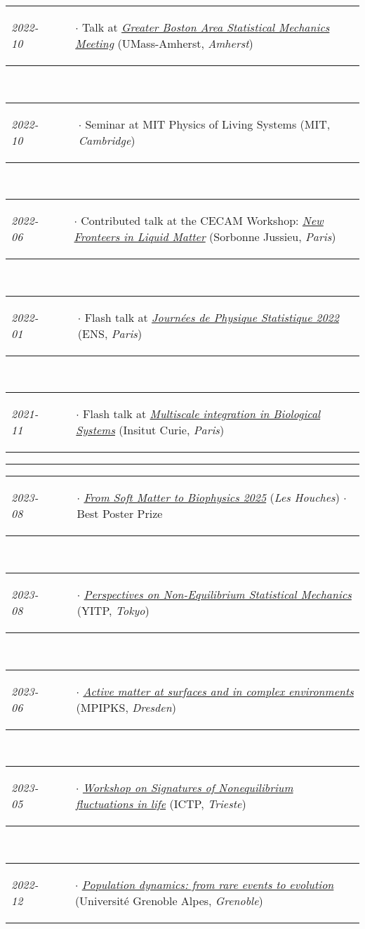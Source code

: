 \documentclass{scrartcl}
\newcommand{\NewItemEntry}[2]{
  \noindent
  \begin{tabular}[r]{p{2.5cm} p{14.0cm}}
    \-\hspace{0.5cm} \small \textit{#1}
    &
    \begin{itemize}
      \vspace{-0.65cm}
      \item[$\cdot$] #2
    \end{itemize}
  \end{tabular}
  \vspace{-0.2cm}
}
\begin{document}
\begin{cv}{}
\NewItemEntry{2022-10}{Talk at \textit{\href{https://sites.google.com/umass.edu/gbasm2022/home}{Greater Boston Area Statistical Mechanics Meeting}} \if{[replacing Prof. Julien Tailleur]}\fi (UMass-Amherst, \textit{Amherst})} \\[\v]
\NewItemEntry{2022-10}{Seminar at MIT Physics of Living Systems (MIT, \textit{Cambridge})}\\[\v]
\NewItemEntry{2022-06}{Contributed talk at the CECAM Workshop: \textit{\href{https://www.cecam.org/workshop-details/1111}{New Fronteers in Liquid Matter}} (Sorbonne Jussieu, \textit{Paris})}\\[\v]
\NewItemEntry{2022-01}{Flash talk at \textit{\href{https://jstat.phys.ens.fr/fr}{Journées de Physique Statistique 2022}} (ENS, \textit{Paris})}\\[\v]
\NewItemEntry{2021-11}{Flash talk at \textit{\href{https://training.institut-curie.org/courses/multiscale-integration-in-biological-systems-3}{Multiscale integration in Biological Systems}} (Insitut Curie, \textit{Paris})}
  
  


\vspace{1em}

\par\noindent\rule{\textwidth}{0.4pt}

\vspace{1.5em}



\noindent{}\vspace{1em}

\NewItemEntry{2023-08}{\textit{\href{https://www.we-heraeus-stiftung.de/veranstaltungen/from-soft-matter-to-biophysics-2025/}{From Soft Matter to Biophysics 2025}} (\textit{Les Houches}) $\cdotp$ \textcolor{carmine}{Best Poster Prize}}\\[\v]
\NewItemEntry{2023-08}{\textit{\href{https://www2.yukawa.kyoto-u.ac.jp/~yitp-ysf2022/index.php}{Perspectives on Non-Equilibrium Statistical Mechanics}} (YITP, \textit{Tokyo})}\\[\v]
\NewItemEntry{2023-06}{\textit{\href{https://www.pks.mpg.de/amsce23}{Active matter at surfaces and in complex environments}} (MPIPKS, \textit{Dresden})}\\[\v]
\NewItemEntry{2023-05}{\textit{\href{https://indico.ictp.it/event/10169/}{Workshop on Signatures of Nonequilibrium fluctuations in life}} (ICTP, \textit{Trieste})}\\[\v]
\NewItemEntry{2022-12}{\textit{\href{https://everevol.sciencesconf.org/}{Population dynamics: from rare events to evolution}} (Université Grenoble Alpes, \textit{Grenoble})}



\end{cv}
\end{document}
